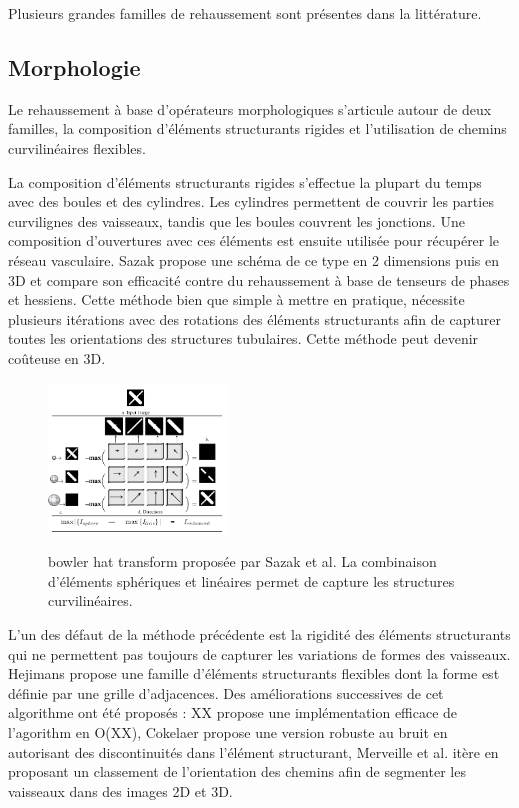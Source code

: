 Plusieurs grandes familles de rehaussement sont présentes dans la littérature. 

\subsection{Morphologie}
\label{sec:EA:rehaussement:morpho}

Le rehaussement à base d'opérateurs morphologiques s'articule autour de deux familles, la composition d'éléments structurants rigides et l'utilisation de chemins curvilinéaires flexibles.

La composition d'éléments structurants rigides s'effectue la plupart du temps avec des boules et des cylindres. Les cylindres permettent de couvrir les parties curvilignes des vaisseaux, tandis que les boules couvrent les jonctions. Une composition d'ouvertures avec ces éléments est ensuite utilisée pour récupérer le réseau vasculaire. Sazak propose une schéma de ce type en 2 dimensions \cite{Sazak2019_bowler_hat_2D} puis en 3D \cite{Sazak2018_bowler_hat_3D} et compare son efficacité contre du rehaussement à base de tenseurs de phases et hessiens. Cette méthode bien que simple à mettre en pratique, nécessite plusieurs itérations avec des rotations des éléments structurants afin de capturer toutes les orientations des structures tubulaires. Cette méthode peut devenir coûteuse en 3D.

\begin{figure}
  \centering
  \includegraphics[height=4cm]{Images/bowlerHat_3D.png}
  \label{fig:sazak_bowler_hat}
  \caption{bowler hat transform proposée par Sazak et al. La combinaison d'éléments sphériques et linéaires permet de capture les structures curvilinéaires. }
\end{figure}

L'un des défaut de la méthode précédente est la rigidité des éléments structurants qui ne permettent pas toujours de capturer les variations de formes des vaisseaux. Hejimans \cite{Heijmans2005_path_opening} propose une famille d'éléments structurants flexibles dont la forme est définie par une grille d'adjacences. Des améliorations successives de cet algorithme ont été proposés : XX propose une implémentation efficace de l'agorithm en O(XX), Cokelaer propose une version robuste au bruit en autorisant des discontinuités dans l'élément structurant, Merveille et al. itère en proposant un classement de l'orientation des chemins afin de segmenter les vaisseaux dans des images 2D et 3D.

